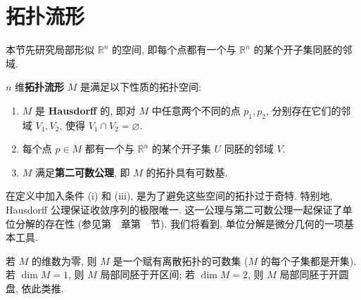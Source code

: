 \section{拓扑流形}\label{sec:topological-manifolds}

本节先研究局部形似 $\mathbb{R}^n$ 的空间, 即每个点都有一个与 $\mathbb{R}^n$ 的某个开子集同胚的邻域.

\begin{RiemannDefinition}\label{def:topological-manifold}
$n$ 维\textbf{拓扑流形} $M$ 是满足以下性质的拓扑空间:
\begin{enumerate}[label=(\roman*),leftmargin=*]
\item $M$ 是 \textbf{Hausdorff} 的, 即对 $M$ 中任意两个不同的点 $p_1,p_2$, 分别存在它们的邻域 $V_1,V_2$, 使得 $V_1\cap V_2=\varnothing$.
\item 每个点 $p\in M$ 都有一个与 $\mathbb{R}^n$ 的某个开子集 $U$ 同胚的邻域 $V$.
\item $M$ 满足\textbf{第二可数公理}, 即 $M$ 的拓扑具有可数基.
\end{enumerate}
\end{RiemannDefinition}

在定义中加入条件 (i) 和 (iii), 是为了避免这些空间的拓扑过于奇特. 特别地, Hausdorff 公理保证收敛序列的极限唯一. 这一公理与第二可数公理一起保证了单位分解的存在性 (参见第~~章第~~节). 我们将看到, 单位分解是微分几何的一项基本工具.

\begin{RiemannRemark}\label{rem:topological-manifolds-low-dimension}
若 $M$ 的维数为零, 则 $M$ 是一个赋有离散拓扑的可数集 ($M$ 的每个子集都是开集). 若 $\dim M=1$, 则 $M$ 局部同胚于开区间; 若 $\dim M=2$, 则 $M$ 局部同胚于开圆盘, 依此类推.
\end{RiemannRemark}

